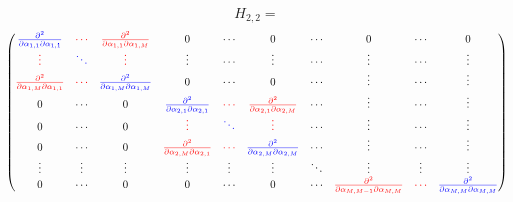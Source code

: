 \documentclass[11pt]{book}
\begin{document}
$$ H_{2,2} = $$
\begin{equation}
\begin{pmatrix}
\textcolor{blue}{\frac{\partial^2 } {\partial \alpha_{1,1} \partial \alpha_{1,1} }          } 
&
 \textcolor{red}{\cdots }
& 
 \textcolor{red}{\frac{\partial^2 }{\partial \alpha_{1,1} \partial \alpha_{1,M} } } 
&
0 & \cdots & 0 & 
\cdots & 0 & 
 \cdots 
&
  0      
\\%
\textcolor{red}{\vdots  }     &  \textcolor{blue}{\ddots }  & \textcolor{red}{\vdots} & \vdots & \cdots & \vdots   & \cdots & \vdots & \cdots & \vdots  
\\%
\textcolor{red}{\frac{\partial^2 }{\partial \alpha_{1,M} \partial \alpha_{1,1} } } & 
\textcolor{red}{\cdots}  & 
\textcolor{blue}{\frac{\partial^2 }{\partial \alpha_{1,M} \partial \alpha_{1,M} }} & 
 0 & \cdots & 0 & \cdots   & \vdots & \cdots & \vdots     
\\%
0  & 
\cdots & 0 & 
\textcolor{blue}{\frac{\partial^2 } {\partial \alpha_{2,1} \partial \alpha_{2,1} }} &
\textcolor{red}{\cdots} & 
\textcolor{red}{\frac{\partial^2 } {\partial \alpha_{2,1} \partial \alpha_{2,M} }}      & 
\cdots & \vdots & \cdots & \vdots
\\%
0  & 
\cdots & 0 & 
\textcolor{red}{\vdots} &
\textcolor{blue}{\ddots }& 
\textcolor{red}{\vdots } & 
\cdots & \vdots & \cdots & \vdots
\\ %
0 &
\cdots & 0 & 
\textcolor{red}{\frac{\partial^2 } {\partial \alpha_{2,M} \partial \alpha_{2,1} }} &
\textcolor{red}{\cdots} & 
\textcolor{blue}{\frac{\partial^2 } {\partial \alpha_{2,M} \partial \alpha_{2,M} }}      & 
\cdots & \vdots & \cdots & \vdots
\\ %
\vdots    &
\vdots & 
\vdots      & 
\vdots & \vdots & \vdots & \ddots &
\vdots & 
\vdots & 
\vdots
\\ %
0      & 
\cdots & 
0      & 
0 & 
\cdots & 
0  & \cdots &
\textcolor{red}{\frac{\partial^2 } {\partial \alpha_{M,M-1} \partial \alpha_{M,M} }} &
\textcolor{red}{\cdots} & 
\textcolor{blue}{\frac{\partial^2 } {\partial \alpha_{M,M} \partial \alpha_{M,M} }}
\end{pmatrix}
\end{equation}
\end{document}
